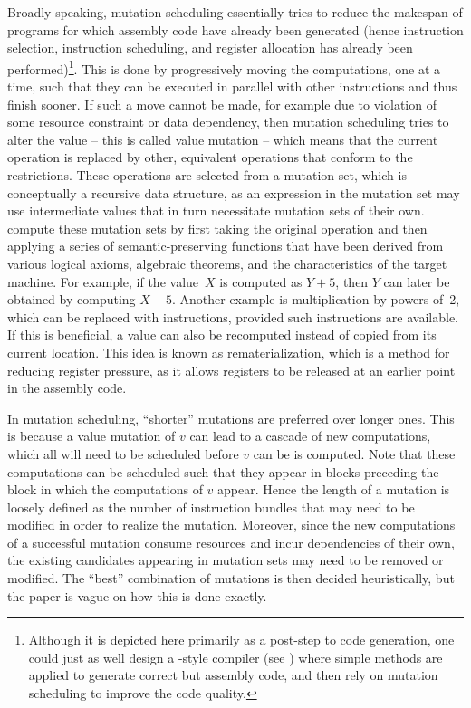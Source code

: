 Broadly speaking, \gls{mutation scheduling} essentially tries to reduce the
makespan of \glspl{program} for which \gls{assembly code} have already been
generated (hence \gls{instruction selection}, \gls{instruction scheduling}, and
\gls{register allocation} has already been performed)\footnote{Although it is
  depicted here primarily as a post-step to \gls{code generation}, one could
  just as well design a -style \gls{compiler}
  (see ) where simple methods are applied to
  generate correct but \naive \gls{assembly code}, and then rely on
  \gls{mutation scheduling} to improve the code quality.}.
%
This is done by
progressively moving the computations, one at a time, such that they can be
executed in parallel with other \glspl{instruction} and thus finish sooner.
%
If
such a move cannot be made, for example due to violation of some resource
constraint or data dependency, then \gls{mutation scheduling} tries to alter the
value -- this is called \gls{value mutation} -- which means that the current
operation is replaced by other, equivalent operations that conform to the
restrictions.
%
These operations are selected from a \gls{mutation set}, which is
conceptually a recursive data structure, as an expression in the \gls{mutation
  set} may use intermediate values that in turn necessitate \glspl{mutation set}
of their own.
%
\citeauthor{Novack2002} compute these \glspl{mutation set} by
first taking the original operation and then applying a series of
semantic-preserving functions that have been derived from various logical
axioms, algebraic theorems, and the characteristics of the \gls{target
  machine}.
%
For example, if the value~$X$ is computed as \mbox{$Y + 5$}, then
$Y$ can later be obtained by computing \mbox{$X - 5$}.
%
Another example is
multiplication by powers of~2, which can be replaced with 
\glspl{instruction}, provided such \glspl{instruction} are available.
%
If this is
beneficial, a value can also be recomputed instead of copied from its current
location.
%
This idea is known as \gls{rematerialization}, which is a method for
reducing \gls{register pressure}, as it allows \glspl{register} to be released
at an earlier point in the \gls{assembly code}.

In \gls{mutation scheduling}, ``shorter'' mutations are preferred over longer
ones.
%
This is because a \gls{value mutation} of $v$ can lead to a cascade of new
computations, which all will need to be scheduled before $v$ can be is
computed.
%
Note that these computations can be scheduled such that they appear in
\glspl{block} preceding the \gls{block} in which the computations of $v$
appear.
%
Hence the length of a mutation is loosely defined as the number of
\gls{instruction} \glspl{bundle} that may need to be modified in order to
realize the mutation.
%
Moreover, since the new computations of a successful
mutation consume resources and incur dependencies of their own, the existing
candidates appearing in \glspl{mutation set} may need to be removed or
modified.
%
The ``best'' combination of mutations is then decided heuristically,
but the paper is vague on how this is done exactly.

